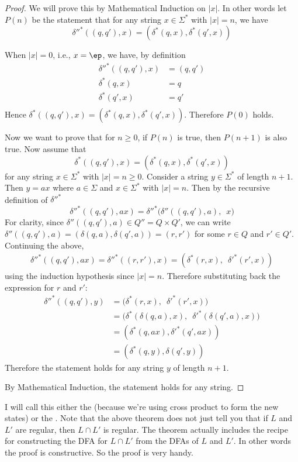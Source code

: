 \begin{proof}
We will prove this by Mathematical Induction on $|x|$.
In other words let $P(n)$ be the statement that for any
string $x \in \Sigma^*$ with $|x| = n$, we have
\[
 \delta''^*((q,q'),x) = (\delta^*(q,x), \delta^*(q',x))
\]

When $|x| = 0$, i.e., $x = \ep$, we have, by definition
\begin{align*}
 \delta''^*((q,q'),x) &= (q,q') \\
 \delta^*(q,x) &= q \\
 \delta^*(q',x) &= q' \\
\end{align*}
Hence $\delta^*((q,q'),x) = (\delta^*(q,x), \delta^*(q',x))$.
Therefore $P(0)$ holds.

Now we want to prove that for $n \geq 0$, if $P(n)$ is true,
then $P(n+1)$ is also true.
Now assume that
\[
 \delta^*((q,q'),x) = (\delta^*(q,x), \delta^*(q',x))
\]
for any string $x \in \Sigma^*$ with $|x| = n
\geq 0$. Consider a string $y\in\Sigma^*$ of length $n+1$. Then $y
= ax$ where $a \in \Sigma$ and $x \in \Sigma^*$ with $|x| = n$.
Then by the recursive definition of $\delta''^*$
\[
\delta''^*((q,q'),ax)
 = \delta''^*\biggl( \delta''((q,q'),a), \,\,\, x\biggr)
\]
For clarity, since $\delta''((q,q'),a) \in Q'' = Q \times Q'$, we
can write $\delta''((q,q'),a) = (\delta(q,a), \delta(q',a)) =
(r,r')$ for some $r \in Q$ and $r' \in Q'$. Continuing the above,
\begin{align*}
\delta''^*((q,q'),ax)
 = \delta''^* ( (r,r'), x )
 = (\delta^*(r,x), \,\,\, \delta'^*(r',x) )
\end{align*}
using the induction hypothesis since $|x| = n$.
 Therefore substituting back the expression for $r$ and $r'$:
\begin{align*}
\delta''^*((q,q'),y)
 &= \biggl(\delta^*(r,x), \,\,\, \delta'^*(r',x) \biggr) \\
 &= \biggl( \delta^*(\delta(q,a),x), \,\,\, \delta'^*(\delta(q',a),x) \biggr) \\
 &= ( \delta^*(q,ax), \delta'^*(q',ax) ) \\
 &= ( \delta^*(q,y),\delta(q',y) )
\end{align*}
Therefore the statement holds for any string $y$ of length $n+1$.

By Mathematical Induction, the statement holds for any string.
\end{proof}

I will call this either the  
(because we're using cross product to form the new states) or the 
.
Note that the above theorem does not just tell you that
if $L$ and $L'$ are regular, then $L \cap L'$ is regular.
The theorem actually includes the recipe for constructing
the DFA for $L \cap L'$ from the DFAs of $L$ and $L'$.
In other words the proof is constructive.
So the proof is very handy.


